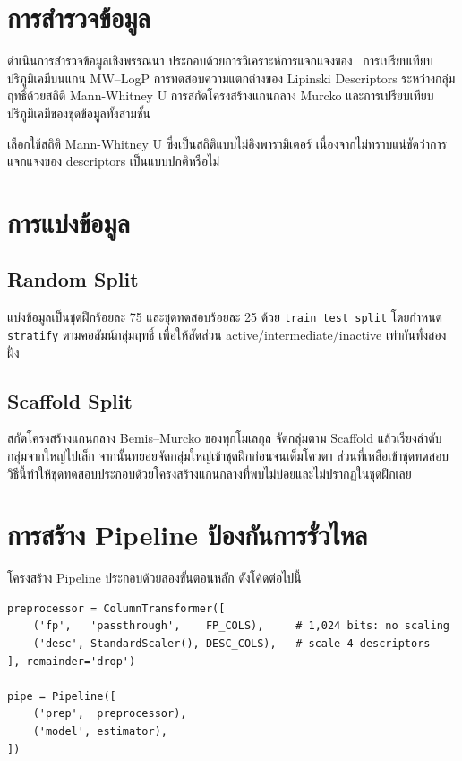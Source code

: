 \section{การสำรวจข้อมูล}

ดำเนินการสำรวจข้อมูลเชิงพรรณนา ประกอบด้วยการวิเคราะห์การแจกแจงของ \pICfifty\ การเปรียบเทียบปริภูมิเคมีบนแกน MW--LogP การทดสอบความแตกต่างของ Lipinski Descriptors ระหว่างกลุ่มฤทธิ์ด้วยสถิติ Mann-Whitney U การสกัดโครงสร้างแกนกลาง Murcko และการเปรียบเทียบปริภูมิเคมีของชุดข้อมูลทั้งสามชั้น

เลือกใช้สถิติ Mann-Whitney U ซึ่งเป็นสถิติแบบไม่อิงพารามิเตอร์ เนื่องจากไม่ทราบแน่ชัดว่าการแจกแจงของ descriptors เป็นแบบปกติหรือไม่

\section{การแบ่งข้อมูล}

\subsection{Random Split}

แบ่งข้อมูลเป็นชุดฝึกร้อยละ 75 และชุดทดสอบร้อยละ 25 ด้วย \texttt{train\_test\_split} โดยกำหนด \texttt{stratify} ตามคอลัมน์กลุ่มฤทธิ์ เพื่อให้สัดส่วน active/intermediate/inactive เท่ากันทั้งสองฝั่ง

\subsection{Scaffold Split}

สกัดโครงสร้างแกนกลาง Bemis--Murcko ของทุกโมเลกุล จัดกลุ่มตาม Scaffold แล้วเรียงลำดับกลุ่มจากใหญ่ไปเล็ก จากนั้นทยอยจัดกลุ่มใหญ่เข้าชุดฝึกก่อนจนเต็มโควตา ส่วนที่เหลือเข้าชุดทดสอบ วิธีนี้ทำให้ชุดทดสอบประกอบด้วยโครงสร้างแกนกลางที่พบไม่บ่อยและไม่ปรากฏในชุดฝึกเลย

\section{การสร้าง Pipeline ป้องกันการรั่วไหล}

โครงสร้าง Pipeline ประกอบด้วยสองขั้นตอนหลัก ดังโค้ดต่อไปนี้

\begin{verbatim}
preprocessor = ColumnTransformer([
    ('fp',   'passthrough',    FP_COLS),     # 1,024 bits: no scaling
    ('desc', StandardScaler(), DESC_COLS),   # scale 4 descriptors
], remainder='drop')

pipe = Pipeline([
    ('prep',  preprocessor),
    ('model', estimator),
])
\end{verbatim}

